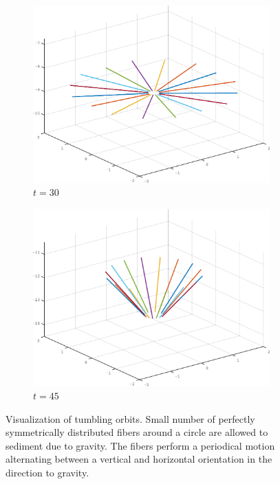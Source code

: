 \begin{figure}[htbp]
\begin{subfigure}[h]{0.45\textwidth}
    \includegraphics[width=\textwidth]{img/ring_00030.pdf}
    \caption{$t=30$}\label{fig:ring_simulation_1c}
  \end{subfigure}
  \begin{subfigure}[h]{0.45\textwidth}
    \centering
    \includegraphics[width=\textwidth]{img/ring_00045.pdf}
    \caption{$t=45$}\label{fig:ring_simulation_1d}
  \end{subfigure}
  \caption[Visualization of tumbling orbits.]{Visualization of tumbling orbits. Small number of perfectly symmetrically distributed fibers around a circle are allowed to sediment due to gravity. The fibers perform a periodical motion alternating between a vertical and horizontal orientation in the direction to gravity.}
  \label{fig:ring_simulation}
\end{figure}

